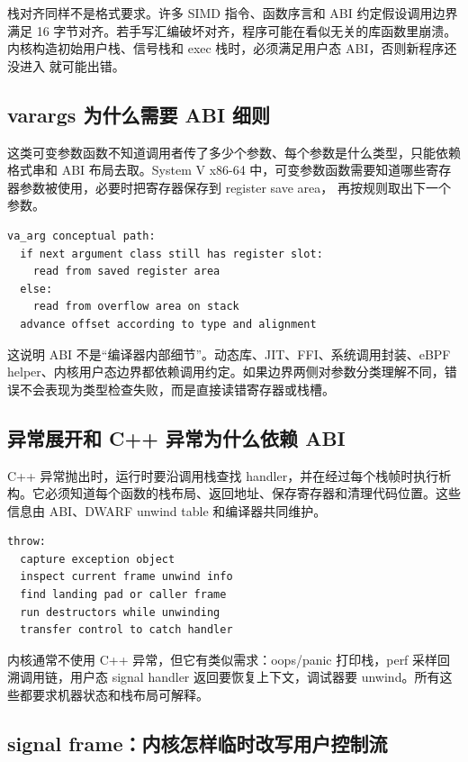 栈对齐同样不是格式要求。许多 SIMD 指令、函数序言和 ABI 约定假设调用边界满足 16 字节对齐。若手写汇编破坏对齐，程序可能在看似无关的库函数里崩溃。内核构造初始用户栈、信号栈和 exec 栈时，必须满足用户态 ABI，否则新程序还没进入  就可能出错。

\subsection{varargs 为什么需要 ABI 细则}

 这类可变参数函数不知道调用者传了多少个参数、每个参数是什么类型，只能依赖格式串和 ABI 布局去取。System V x86-64 中，可变参数函数需要知道哪些寄存器参数被使用，必要时把寄存器保存到 register save area， 再按规则取出下一个参数。

\begin{lstlisting}
va_arg conceptual path:
  if next argument class still has register slot:
    read from saved register area
  else:
    read from overflow area on stack
  advance offset according to type and alignment
\end{lstlisting}

这说明 ABI 不是“编译器内部细节”。动态库、JIT、FFI、系统调用封装、eBPF helper、内核用户态边界都依赖调用约定。如果边界两侧对参数分类理解不同，错误不会表现为类型检查失败，而是直接读错寄存器或栈槽。

\subsection{异常展开和 C++ 异常为什么依赖 ABI}

C++ 异常抛出时，运行时要沿调用栈查找 handler，并在经过每个栈帧时执行析构。它必须知道每个函数的栈布局、返回地址、保存寄存器和清理代码位置。这些信息由 ABI、DWARF unwind table 和编译器共同维护。

\begin{lstlisting}
throw:
  capture exception object
  inspect current frame unwind info
  find landing pad or caller frame
  run destructors while unwinding
  transfer control to catch handler
\end{lstlisting}

内核通常不使用 C++ 异常，但它有类似需求：oops/panic 打印栈，perf 采样回溯调用链，用户态 signal handler 返回要恢复上下文，调试器要 unwind。所有这些都要求机器状态和栈布局可解释。

\subsection{signal frame：内核怎样临时改写用户控制流}

